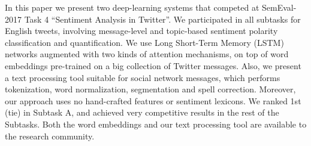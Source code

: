 In this paper we present two deep-learning systems that competed at SemEval-2017 Task 4 ``Sentiment Analysis in Twitter''. We participated in all subtasks for English tweets, involving message-level and topic-based sentiment polarity classification and quantification. We use Long Short-Term Memory (LSTM) networks augmented with two kinds of attention mechanisms, on top of word embeddings pre-trained on a big collection of Twitter messages. Also, we present a text processing tool suitable for social network messages, which performs tokenization, word normalization, segmentation and spell correction. Moreover, our approach uses no hand-crafted features or sentiment lexicons. We ranked 1st (tie) in Subtask A, and achieved very competitive results in the rest of the Subtasks. Both the word embeddings and our text processing tool are available to the research community.
